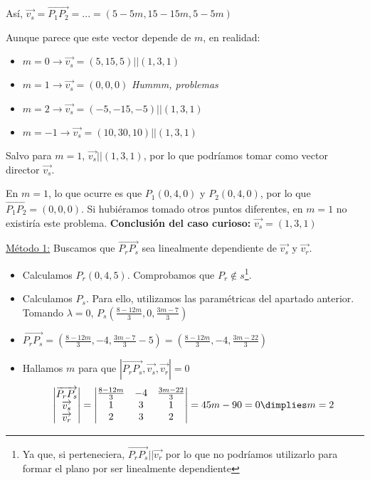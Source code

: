 \documentclass[palatino,nosec,nochap,nobuilddate]{Docencia}
\renewcommand{\vec}[1]{\overrightarrow{#1}}
\begin{document}
\begin{problem}
Así, $\vec{v_s} = \vec{P_1P_2} = ... = \left(5-5m,15-15m,5-5m\right)$

Aunque parece que este vector depende de $m$, en realidad:
\begin{itemize}
	\item $m=0 \to \vec{v_s} = (5,15,5) || (1,3,1)$
	\item $m=1 \to \vec{v_s} = (0,0,0)$ \textit{Hummm, problemas}
	\item $m=2 \to \vec{v_s} = (-5,-15,-5) || (1,3,1)$
	\item $m=-1 \to \vec{v_s} = (10,30,10) || (1,3,1)$
\end{itemize}

Salvo para $m=1$, $\vec{v_s} || (1,3,1)$, por lo que podríamos tomar como vector director $\vec{v_s}$.

En $m=1$, lo que ocurre es que $P_1(0,4,0)$ y $P_2(0,4,0)$, por lo que $\vec{P_1P_2} = (0,0,0)$. Si hubiéramos tomado otros puntos diferentes, en $m=1$ no existiría este problema.
\textbf{Conclusión del caso curioso:} $\vec{v_s} = (1,3,1)$

\spart \ul{Método 1:} Buscamos que $\vec{P_rP_s}$ sea linealmente dependiente de $\vec{v_s}$ y $\vec{v_r}$.

\begin{itemize}
	\item Calculamos $P_r(0,4,5)$. Comprobamos que $P_r\not\in s$\footnote{Ya que, si perteneciera, $\vec{P_rP_s} || \vec{v_r}$ por lo que no podríamos utilizarlo para formar el plano por ser linealmente dependiente}.
	\item Calculamos $P_s$. Para ello, utilizamos las paramétricas del apartado anterior.
	\subitem Tomando $\lambda=0$, $P_s\left(\frac{8-12m}{3},0,\frac{3m-7}{3}\right)$
	\item $\vec{P_rP_s} = \left(\frac{8-12m}{3},-4,\frac{3m-7}{3}-5\right) = \left(\frac{8-12m}{3},-4,\frac{3m-22}{3}\right)$
	\item Hallamos $m$ para que $|\vec{P_rP_s},\vec{v_s},\vec{v_r}| = 0$
\[
\left|
\begin{matrix}
\vec{P_rP_s}\\
\vec{v_s}\\
\vec{v_r}
\end{matrix}
\right| =
\left|
\begin{matrix}
\frac{8-12m}{3}&-4&\frac{3m-22}{3}\\
1&3&1\\
2&3&2\\
\end{matrix}
\right| = 45m-90 = 0\dimplies m=2
\]


\end{itemize}
\end{problem}
\end{document}
